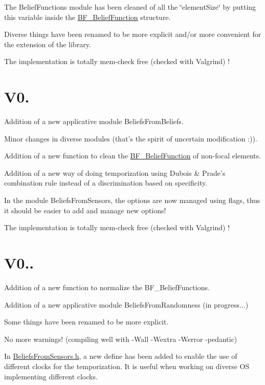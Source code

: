  The Belief\-Functions module has been cleaned of all the \char`\"{}element\-Size\char`\"{} by putting this variable inside the \hyperlink{struct_b_f___belief_function}{B\-F\-\_\-\-Belief\-Function} structure. \par
 Diverse things have been renamed to be more explicit and/or more convenient for the extension of the library. \par
 The implementation is totally mem-\/check free (checked with Valgrind) ! \par
\hypertarget{version_sec_v05_subsec}{}\section{V0.}\label{version_sec_v05_subsec}
Addition of a new applicative module Beliefs\-From\-Beliefs. \par
 Minor changes in diverse modules (that's the spirit of uncertain modification \-:)). \par
 Addition of a new function to clean the \hyperlink{struct_b_f___belief_function}{B\-F\-\_\-\-Belief\-Function} of non-\/focal elements. \par
 Addition of a new way of doing temporization using Dubois \& Prade's combination rule instead of a discrimination based on specificity. \par
 In the module Beliefs\-From\-Sensors, the options are now managed using flags, thus it should be easier to add and manage new options! \par
 The implementation is totally mem-\/check free (checked with Valgrind) ! \par
\hypertarget{version_sec_v051_subsec}{}\section{V0..}\label{version_sec_v051_subsec}
Addition of a new function to normalize the B\-F\-\_\-\-Belief\-Functions. \par
 Addition of a new applicative module Beliefs\-From\-Randomness (in progress...) \par
 Some things have been renamed to be more explicit. \par
 No more warnings! (compiling well with -\/\-Wall -\/\-Wextra -\/\-Werror -\/pedantic) \par
 In \hyperlink{_beliefs_from_sensors_8h}{Beliefs\-From\-Sensors.\-h}, a new define has been added to enable the use of different clocks for the temporization. It is useful when working on diverse O\-S implementing different clocks. \par
